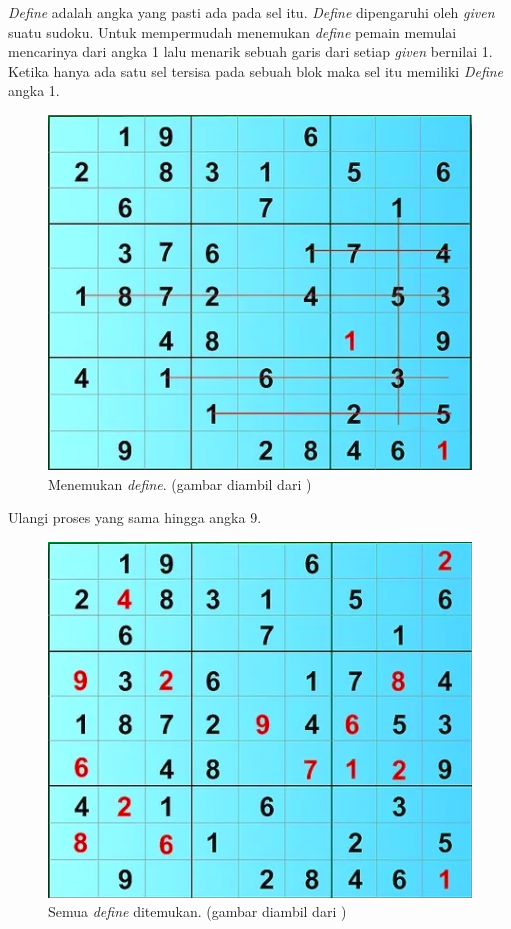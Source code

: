 \textit{Define} adalah angka yang pasti ada pada sel itu. \textit{Define} dipengaruhi oleh \textit{given} suatu sudoku. Untuk mempermudah menemukan \textit{define} pemain memulai mencarinya dari angka 1 lalu menarik sebuah garis dari setiap \textit{given} bernilai 1. Ketika hanya ada satu sel tersisa pada sebuah blok maka sel itu memiliki \textit{Define} angka 1. 

\begin{figure}[H]
	\begin{centering}
		\includegraphics[scale=0.7]{gambar/solve2}
		
		\caption{Menemukan \textit{define}. (gambar diambil dari \cite{Sud12})}
	\end{centering}
\end{figure}

Ulangi proses yang sama hingga angka 9.

\begin{figure}[H]
	\begin{centering}
		\includegraphics[scale=0.7]{gambar/solve3}
		
		\caption{Semua \textit{define} ditemukan. (gambar diambil dari \cite{Sud12})}
	\end{centering}
\end{figure}



